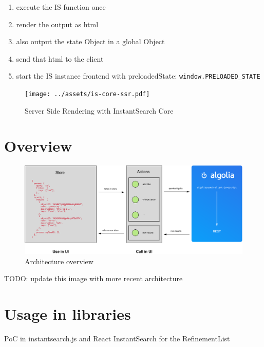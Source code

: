 \begin{enumerate}
  \item execute the IS function once
  \item render the output as html
  \item also output the state Object in a global Object
  \item send that html to the client
  \item start the IS instance frontend with preloadedState: {\tt window.PRELOADED\_STATE} %
\end{enumerate}

\begin{figure}[H]
  \centering
  \texttt{[image: ../assets/is-core-ssr.pdf]}
  \caption{Server Side Rendering with InstantSearch Core}
  \label{figure:is-core-ssr}
\end{figure} %


\section{Overview} %
\label{sec:overview}

\begin{figure}[H]
  \centering
  \includegraphics[width=\textwidth]{../assets/architecture.pdf}
  \caption{Architecture overview\cite{blog-architecture}}
  \label{figure:core-architecture}
\end{figure}

TODO: update this image with more recent architecture %


\section{Usage in libraries} %
\label{sec:usage_in_libraries}

PoC in instantsearch.js and React InstantSearch for the RefinementList %

